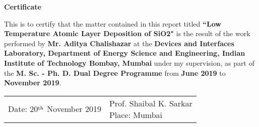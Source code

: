 \begin{center}
{\LARGE \textbf{ Certificate}}
\end{center}
This is to certify that the matter contained in this report titled \textbf{``Low Temperature Atomic Layer Deposition of {SiO2}"}  is the result of the work performed by \textbf{ Mr. Aditya Chalishazar} at the \textbf{Devices and Interfaces Laboratory, Department of Energy Science and Engineering, Indian Institute of Technology Bombay, Mumbai} under my supervision, as part of the \textbf{M. Sc. - Ph. D. Dual Degree Programme} from \textbf{June 2019} to \textbf{November 2019}.
\vspace{3 cm}

\begin{tabular}{p{80mm}  p{80mm}}
     Date: 20$^{\rm th}$ November 2019 &\makecell[r]{Prof. Shaibal K. Sarkar\\ Place: Mumbai} 
\end{tabular}
